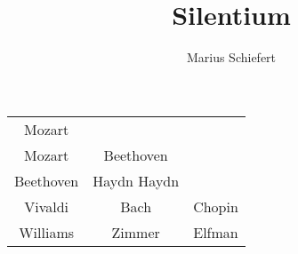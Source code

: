 \documentclass[a4paper]{scrbook}
\title{\calligra Silentium}
\author{Marius Schiefert}
\begin{document}
\maketitle
\begin{tabular}{|c|c|c|}
	\hline
	Mozart \\ Mozart & Beethoven \\ Beethoven & Haydn Haydn \\
	\hline
	Vivaldi & Bach & Chopin  \\
	\hline 
	Williams & Zimmer & Elfman \\
	\hline
\end{tabular}
%
%
\end{document}
